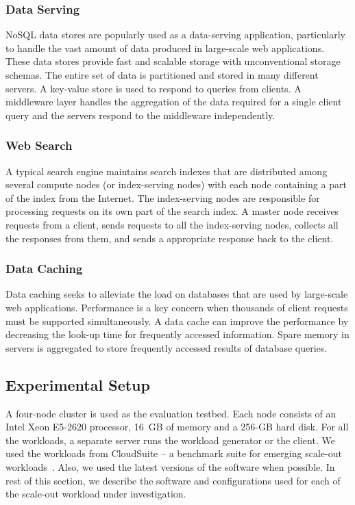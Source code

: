 \documentclass{sig-alternate}
\begin{document}
\subsubsection{Data Serving}

NoSQL data stores are popularly used as a data-serving application,
particularly to handle the vast amount of data produced in large-scale web
applications. These data stores provide fast and scalable storage with
unconventional storage schemas. The entire set of data is partitioned
and stored in many different servers.  A key-value store is used to
respond to queries from clients. A middleware layer handles 
the aggregation of the data required for a single client query and the
servers respond to the middleware independently.

\subsubsection{Web Search}
A typical search engine
maintains search indexes that are distributed among several compute nodes (or
index-serving nodes) with each node containing a part of the index
from the Internet. The index-serving nodes are responsible for processing
requests on its own part of the search index. A master node receives
requests from a client, sends requests to all the index-serving nodes,
collects all the responses from them, and sends a appropriate response
back to the client.

\subsubsection{Data Caching}
Data caching seeks to alleviate the load on databases that are used by
large-scale web applications. Performance is a key concern when 
thousands of client requests must be supported simultaneously. A data
cache can improve the performance by decreasing the look-up time
for frequently accessed information. Spare memory in servers is
aggregated to store frequently accessed results of database queries.

\subsection{Experimental Setup}
A four-node cluster is used as the evaluation testbed. 
Each node consists of an Intel Xeon E5-2620 processor, 16~GB of memory 
and a 256-GB hard disk. For all the workloads, a separate server
runs the workload generator or the client. We used the 
workloads from CloudSuite -- a benchmark suite for emerging scale-out 
workloads~\cite{cloudsuite}. Also, we used the latest versions of the software when possible. 
In rest of this section, we describe the software and configurations used 
for each of the scale-out workload under investigation. 
\end{document}
